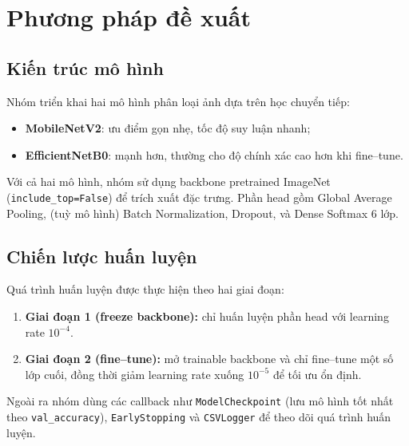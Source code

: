 \documentclass[12pt,a4paper]{article}
\begin{document}
\FloatBarrier

\section{Phương pháp đề xuất}\label{sec:phuong-phap}

\subsection{Kiến trúc mô hình}
Nhóm triển khai hai mô hình phân loại ảnh dựa trên học chuyển tiếp:
\begin{itemize}
    \item \textbf{MobileNetV2}: ưu điểm gọn nhẹ, tốc độ suy luận nhanh;
    \item \textbf{EfficientNetB0}: mạnh hơn, thường cho độ chính xác cao hơn khi fine--tune.
\end{itemize}
Với cả hai mô hình, nhóm sử dụng backbone pretrained ImageNet (\texttt{include\_top=False}) để trích xuất đặc trưng. Phần head gồm Global Average Pooling, (tuỳ mô hình) Batch Normalization, Dropout, và Dense Softmax 6 lớp.

\subsection{Chiến lược huấn luyện}
Quá trình huấn luyện được thực hiện theo hai giai đoạn:
\begin{enumerate}
    \item \textbf{Giai đoạn 1 (freeze backbone):} chỉ huấn luyện phần head với learning rate $10^{-4}$.
    \item \textbf{Giai đoạn 2 (fine--tune):} mở trainable backbone và chỉ fine--tune một số lớp cuối, đồng thời giảm learning rate xuống $10^{-5}$ để tối ưu ổn định.
\end{enumerate}
Ngoài ra nhóm dùng các callback như \texttt{ModelCheckpoint} (lưu mô hình tốt nhất theo \texttt{val\_accuracy}), \texttt{EarlyStopping} và \texttt{CSVLogger} để theo dõi quá trình huấn luyện.
\end{document}
